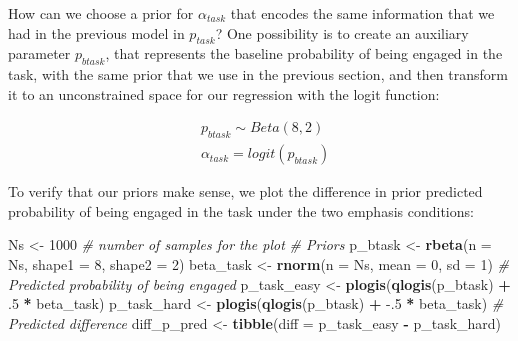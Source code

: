 \documentclass[12pt,]{krantz}
\newenvironment{Shaded}{\begin{snugshade}}{\end{snugshade}}
\newcommand{\CommentTok}[1]{\textcolor[rgb]{0.56,0.35,0.01}{\textit{#1}}}
\newcommand{\DataTypeTok}[1]{\textcolor[rgb]{0.13,0.29,0.53}{#1}}
\newcommand{\DecValTok}[1]{\textcolor[rgb]{0.00,0.00,0.81}{#1}}
\newcommand{\FloatTok}[1]{\textcolor[rgb]{0.00,0.00,0.81}{#1}}
\newcommand{\KeywordTok}[1]{\textcolor[rgb]{0.13,0.29,0.53}{\textbf{#1}}}
\newcommand{\NormalTok}[1]{#1}
\newcommand{\OperatorTok}[1]{\textcolor[rgb]{0.81,0.36,0.00}{\textbf{#1}}}
\newcommand{\StringTok}[1]{\textcolor[rgb]{0.31,0.60,0.02}{#1}}
\theoremstyle{definition}
\theoremstyle{definition}
\theoremstyle{definition}
\theoremstyle{remark}
\begin{document}
How can we choose a prior for \(\alpha_{task}\) that encodes the same information that we had in the previous model in \(p_{task}\)? One possibility is to create an auxiliary parameter \(p_{btask}\), that represents the baseline probability of being engaged in the task, with the same prior that we use in the previous section, and then transform it to an unconstrained space for our regression with the logit function:

\begin{equation}
\begin{aligned}
&p_{btask} \sim Beta(8, 2)\\
&\alpha_{task} = logit(p_{btask})
\end{aligned}
\end{equation}

To verify that our priors make sense, we plot the difference in prior predicted probability of being engaged in the task under the two emphasis conditions:

\begin{Shaded}
\begin{Highlighting}[]
\NormalTok{Ns <-}\StringTok{ }\DecValTok{1000} \CommentTok{# number of samples for the plot}
\CommentTok{# Priors}
\NormalTok{p_btask <-}\StringTok{ }\KeywordTok{rbeta}\NormalTok{(}\DataTypeTok{n =}\NormalTok{ Ns, }\DataTypeTok{shape1 =} \DecValTok{8}\NormalTok{, }\DataTypeTok{shape2 =} \DecValTok{2}\NormalTok{)}
\NormalTok{beta_task <-}\StringTok{ }\KeywordTok{rnorm}\NormalTok{(}\DataTypeTok{n =}\NormalTok{ Ns, }\DataTypeTok{mean =} \DecValTok{0}\NormalTok{, }\DataTypeTok{sd =} \DecValTok{1}\NormalTok{)}
\CommentTok{# Predicted probability of being engaged}
\NormalTok{p_task_easy <-}\StringTok{ }\KeywordTok{plogis}\NormalTok{(}\KeywordTok{qlogis}\NormalTok{(p_btask) }\OperatorTok{+}\StringTok{ }\FloatTok{.5} \OperatorTok{*}\StringTok{ }\NormalTok{beta_task)}
\NormalTok{p_task_hard <-}\StringTok{ }\KeywordTok{plogis}\NormalTok{(}\KeywordTok{qlogis}\NormalTok{(p_btask) }\OperatorTok{+}\StringTok{ }\FloatTok{-.5} \OperatorTok{*}\StringTok{ }\NormalTok{beta_task)}
\CommentTok{# Predicted difference}
\NormalTok{diff_p_pred <-}\StringTok{ }\KeywordTok{tibble}\NormalTok{(}\DataTypeTok{diff =}\NormalTok{ p_task_easy }\OperatorTok{-}\StringTok{ }\NormalTok{p_task_hard)}
\end{Highlighting}
\end{Shaded}

\begin{Shaded}
\end{Shaded}
\end{document}
